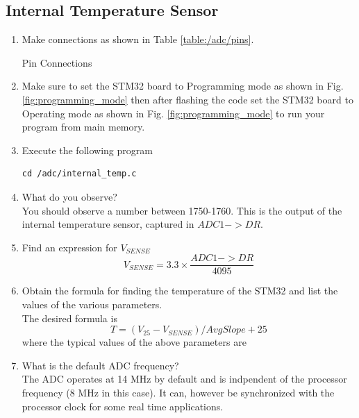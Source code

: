 \documentclass[journal,12pt,twocolumn]{IEEEtran}
\renewcommand\thesection{\arabic{section}}
\renewcommand\thesubsection{\thesection.\arabic{subsection}}
\begin{document}
\subsection{Internal Temperature Sensor}
\renewcommand{\theequation}{\theenumi}
\renewcommand{\thefigure}{\theenumi}
\begin{enumerate}[label=\thesubsection.\arabic*.,ref=\thesubsection.\theenumi]
\item Make connections as shown in Table \ref{table:/adc/pins}.
\begin{table}[!ht]
\footnotesize

\caption{Pin Connections}
\label{table:/adc/pins}
\end{table}
\item Make sure to set the STM32 board to Programming mode as shown in Fig. \ref{fig:programming_mode} then after flashing the code set the STM32 board to Operating mode as shown in Fig. \ref{fig:programming_mode} to run your program from main memory.
\item Execute the following program
\begin{lstlisting}
cd /adc/internal_temp.c
\end{lstlisting}
\item What do you observe?
\\
\solution You should observe a number between 1750-1760. This is the output of the internal temperature
sensor, captured in $ADC1->DR$.
\item Find an expression for $V_{SENSE}$
\\
\solution
\begin{equation}
V_{SENSE} = 3.3 \times \frac{ADC1->DR}{4095}
\end{equation}
%
\item Obtain the formula for finding the temperature of the STM32 and list the values of the various parameters.
\\
\solution The desired formula is
\begin{equation}
T = (V_{25}-V_{SENSE})/AvgSlope + 25
\end{equation}
where the typical values of the above parameters are 

%
\item What is the default ADC frequency?
\\
\solution The ADC operates at 14 MHz by default and is indpendent of the processor frequency (8 MHz in this case). It can, however be synchronized with
the processor clock for some real time applications.

\end{enumerate}
\end{document}
